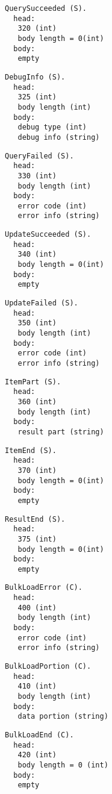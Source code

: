 \documentclass[a4paper,12pt]{article}
\begin{document}
\begin{verbatim}
QuerySucceeded (S).
  head:
   320 (int)
   body length = 0(int)
  body:
   empty
\end{verbatim}

\begin{verbatim}
DebugInfo (S).
  head:
   325 (int)
   body length (int)
  body:
   debug type (int)
   debug info (string)
\end{verbatim}

\begin{verbatim}
QueryFailed (S).
  head:
   330 (int)
   body length (int)
  body:
   error code (int)
   error info (string)
\end{verbatim}

\begin{verbatim}
UpdateSucceeded (S).
  head:
   340 (int)
   body length = 0(int)
  body:
   empty
\end{verbatim}

\begin{verbatim}
UpdateFailed (S).
  head:
   350 (int)
   body length (int)
  body:
   error code (int)
   error info (string)
\end{verbatim}

\begin{verbatim}
ItemPart (S).
  head:
   360 (int)
   body length (int)
  body:
   result part (string)
\end{verbatim}

\begin{verbatim}
ItemEnd (S).
  head:
   370 (int)
   body length = 0(int)
  body:
   empty
\end{verbatim}

\begin{verbatim}
ResultEnd (S).
  head:
   375 (int)
   body length = 0(int)
  body:
   empty
\end{verbatim}

\begin{verbatim}
BulkLoadError (C).
  head:
   400 (int)
   body length (int)
  body:
   error code (int)
   error info (string)
\end{verbatim}

\begin{verbatim}
BulkLoadPortion (C).
  head:
   410 (int)
   body length (int)
  body:
   data portion (string)
\end{verbatim}

\begin{verbatim}
BulkLoadEnd (C).
  head:
   420 (int)
   body length = 0 (int)
  body:
   empty
\end{verbatim}
\end{document}
